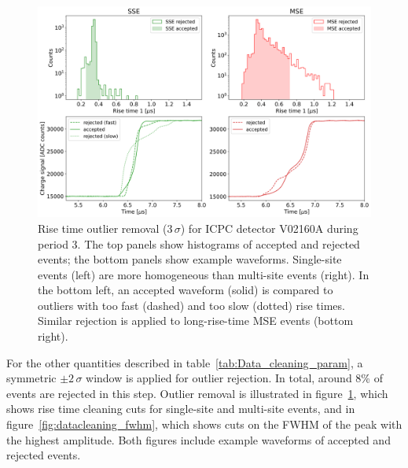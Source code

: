 \begin{figure}[t]
    \centering
    \includegraphics[width=\linewidth]{figures/05_PSD/Plot_DataCleaning_rt1_V02160A.png}
    \caption{Rise time outlier removal ($3 \, \sigma$) for ICPC detector V02160A during period 3. The top panels show histograms of accepted and rejected events; the bottom panels show example waveforms. Single-site events (left) are more homogeneous than multi-site events (right). In the bottom left, an accepted waveform (solid) is compared to outliers with too fast (dashed) and too slow (dotted) rise times. Similar rejection is applied to long-rise-time MSE events (bottom right).}
    \label{fig:datacleaning_rt1}
\end{figure}

For the other quantities described in table~\ref{tab:Data_cleaning_param}, a symmetric $ \pm 2 \, \sigma$ window is applied for outlier rejection. In total, around 8\% of events are rejected in this step. Outlier removal is illustrated in figure~\ref{fig:datacleaning_rt1}, which shows rise time cleaning cuts for single-site and multi-site events, and in figure~\ref{fig:datacleaning_fwhm}, which shows cuts on the FWHM of the peak with the highest amplitude. Both figures include example waveforms of accepted and rejected events. 



